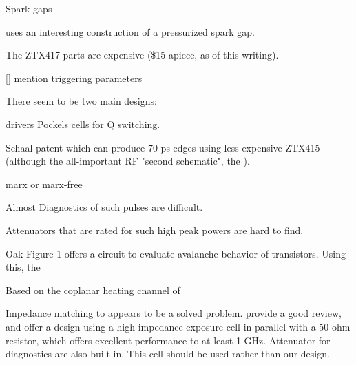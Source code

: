 \documentclass[paper.tex]{subfiles}
\begin{document}
Spark gaps 

\cite{kHz1995} uses an interesting construction of a pressurized spark gap.

The ZTX417 parts are expensive (\$15 apiece, as of this writing). 

[] mention triggering parameters

There seem to be two main designs: 

drivers Pockels cells for Q switching.

Schaal patent  which can produce 70 ps edges using less expensive ZTX415 (although the all-important RF "second schematic", the ).

marx or marx-free



Almost   Diagnostics of such pulses are difficult.

Attenuators that are rated for such high peak powers are hard to find.


Oak \cite{fast1991} Figure 1 offers a circuit to evaluate avalanche behavior of transistors. Using this, the 


Based on the coplanar heating cnannel of \cite{Microwave2007}

Impedance matching to appears to be a solved problem. \cite{Microchamber2011} provide a good review, and offer a design using a high-impedance exposure cell in parallel with a 50 ohm resistor, which offers excellent performance to at least 1 GHz. Attenuator for diagnostics are also built in. This cell should be used rather than our design. \cite{Characterization2012}
\end{document}
